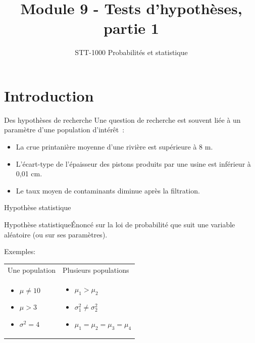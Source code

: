 \documentclass{BeamerTemplate}
\title{Module 9 - Tests d'hypothèses, partie 1}
\subtitle{STT-1000 Probabilités et statistique}
\begin{document}
\AtBeginSection{\frame{\sectionpage}}

\begin{frame}

\titlepage

\end{frame}

\section{Introduction}

\begin{frame}[t]{Des hypothèses de recherche}
Une question de recherche est souvent liée à un paramètre d'une population d'intérêt~:
\bigskip

\begin{itemize}\itemsep 5mm
\item La crue printanière moyenne d'une rivière est supérieure à 8 m.
\item L'écart-type de l'épaisseur des pistons produits par une usine est inférieur à 0,01 cm.
\item Le taux moyen de contaminants diminue après la filtration.
\end{itemize}
\end{frame}

\begin{frame}[t]{Hypothèse statistique}

\begin{Boite}{Hypothèse statistique}{Énoncé sur la loi de probabilité que suit une variable aléatoire (ou sur ses paramètres).}
\end{Boite}

\medskip
Exemples:
\medskip

\begin{tabular}{p{5cm}p{5cm}}
Une population & Plusieurs populations\\
\begin{itemize}
\item $\mu \ne 10$
\item $\mu > 3$
\item $\sigma^2 = 4$
\end{itemize}
&
\begin{itemize}
\item $\mu_1 > \mu_2$
\item $\sigma^2_1 \ne \sigma^2_2$
\item $\mu_1=\mu_2=\mu_3=\mu_4$
\end{itemize}
\end{tabular}
\end{frame}
\end{document}
